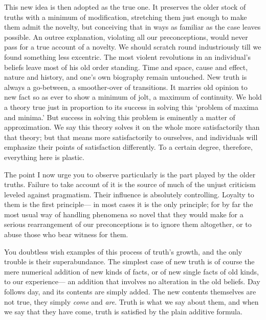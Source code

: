 \documentclass[]{article}
\begin{document}
This new idea is then adopted as the true one. It preserves the older
stock of truths with a minimum of modification, stretching them just
enough to make them admit the novelty, but conceiving that in ways as
familiar as the case leaves possible. An outree explanation, violating
all our preconceptions, would never pass for a true account of a
novelty. We should scratch round industriously till we found something
less excentric. The most violent revolutions in an individual's beliefs
leave most of his old order standing. Time and space, cause and effect,
nature and history, and one's own biography remain untouched. New truth
is always a go-between, a smoother-over of transitions. It marries old
opinion to new fact so as ever to show a minimum of jolt, a maximum of
continuity. We hold a theory true just in proportion to its success in
solving this `problem of maxima and minima.' But success in solving
this problem is eminently a matter of approximation. We say this theory
solves it on the whole more satisfactorily than that theory; but that
means more satisfactorily to ourselves, and individuals will emphasize
their points of satisfaction differently. To a certain degree,
therefore, everything here is plastic.

The point I now urge you to observe particularly is the part played by
the older truths. Failure to take account of it is the source of much
of the unjust criticism leveled against pragmatism. Their influence is
absolutely controlling. Loyalty to them is the first principle--- in
most cases it is the only principle; for by far the most usual way
of handling phenomena so novel that they would make for a serious
rearrangement of our preconceptions is to ignore them altogether, or to
abuse those who bear witness for them.

You doubtless wish examples of this process of truth's growth, and the
only trouble is their superabundance. The simplest case of new truth is
of course the mere numerical addition of new kinds of facts, or of new
single facts of old kinds, to our experience--- an addition that involves
no alteration in the old beliefs. Day follows day, and its contents are
simply added. The new contents themselves are not true, they simply \emph{come}
and \emph{are}. Truth is what we say about them, and when we say that they have
come, truth is satisfied by the plain additive formula.
\end{document}
